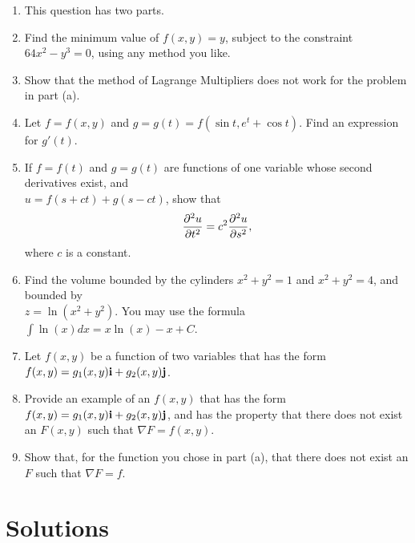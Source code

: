 \documentclass{article}
\begin{document}
\begin{enumerate}
\item %
This question has two parts.
\BEN
\item Find the minimum value of $f(x,y) = y$, subject to the constraint $64x^2-y^3=0$, using any method you like.
\item Show that the method of Lagrange Multipliers does not work for the problem in part (a). 
\EEN
\item %
Let $f=f(x,y)$ and $g=g(t)=f(\sin t, e^t+\cos t)$. Find an expression for $g'(t)$.
\item %
If $f=f(t)$ and $g=g(t)$ are functions of one variable whose second derivatives exist, and \\ $u=f(s+ct)+g(s-ct)$, show that 
\begin{align*}
  \frac{\partial^2u}{\partial t^2}=c^2\frac{\partial^2 u}{\partial s^2},
\end{align*}
where $c$ is a constant. 
\item %
Find the volume bounded by the cylinders $x^2+y^2=1$ and $x^2+y^2 = 4$, and bounded by \\ $z = \ln(x^2+y^2)$. You may use the formula $\int \ln(x)dx = x\ln(x)-x+C$. 
\item %
Let $f(x,y)$ be a function of two variables that has the form $f(x,y) = g_1(x,y)\mathbf{i} + g_2(x,y)\mathbf{j}$.
\BEN
\item Provide an example of an $f(x,y)$ that has the form $f(x,y) = g_1(x,y)\mathbf{i} + g_2(x,y)\mathbf{j}$, and has the property that there does not exist an $F(x,y)$ such that $\nabla F = f(x,y)$. 
\item Show that, for the function you chose in part (a), that there does not exist an $F$ such that $\nabla F=f$.
\EEN

\end{enumerate} %
\newpage
\section*{Solutions}
\end{document}
